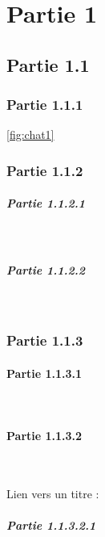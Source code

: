 \section{Partie 1 \label{sec:partie_1}}

\subsection{Partie 1.1} %
\label{sec:partie_1_1}

\subsubsection{Partie 1.1.1}

\autoref{fig:chat1}



\subsubsection{Partie 1.1.2}

\subparagraph{Partie 1.1.2.1}
~~\newline

\subparagraph{Partie 1.1.2.2}
~~\newline


\subsubsection{Partie 1.1.3 \label{sec:partie_1_1_3}}





\paragraph{Partie 1.1.3.1 \label{sec:partie_1_1_3_1}}
~~\newline

\paragraph{Partie 1.1.3.2}
\label{sec:partie_1_1_3_2}
~~\newline

Lien vers un titre : 

\subparagraph{Partie 1.1.3.2.1}
~~\newline

